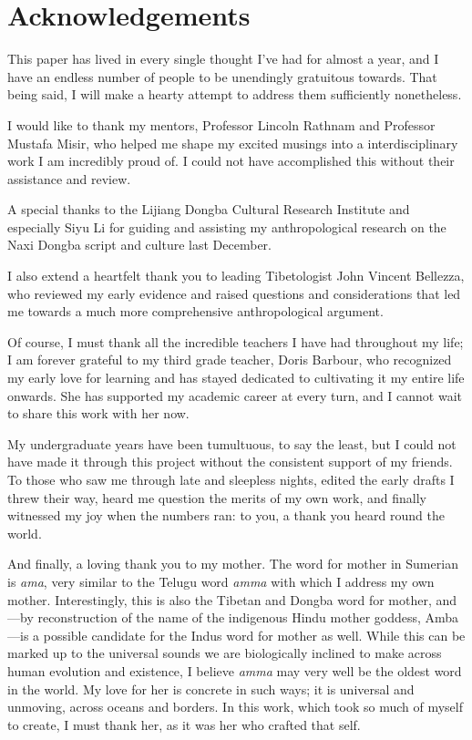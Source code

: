 \documentclass[11pt,a4paper,oneside]{report}
\begin{document}
\vspace{4\bigskipamount}




\chapter*{Acknowledgements}
\label{acknowledgements}

This paper has lived in every single thought I’ve had for almost a year, and I have an endless number of people to be unendingly gratuitous towards. That being said, I will make a hearty attempt to address them sufficiently nonetheless.

I would like to thank my mentors, Professor Lincoln Rathnam and Professor Mustafa Misir, who helped me shape my excited musings into a interdisciplinary work I am incredibly proud of. I could not have accomplished this without their assistance and review.

A special thanks to the Lijiang Dongba Cultural Research Institute and especially Siyu Li for guiding and assisting my anthropological research on the Naxi Dongba script and culture last December.

I also extend a heartfelt thank you to leading Tibetologist John Vincent Bellezza, who reviewed my early evidence and raised questions and considerations that led me towards a much more comprehensive anthropological argument.

Of course, I must thank all the incredible teachers I have had throughout my life; I am forever grateful to my third grade teacher, Doris Barbour, who recognized my early love for learning and has stayed dedicated to cultivating it my entire life onwards. She has supported my academic career at every turn, and I cannot wait to share this work with her now.

My undergraduate years have been tumultuous, to say the least, but I could not have made it through this project without the consistent support of my friends. To those who saw me through late and sleepless nights, edited the early drafts I threw their way, heard me question the merits of my own work, and finally witnessed my joy when the numbers ran: to you, a thank you heard round the world.

And finally, a loving thank you to my mother. The word for mother in Sumerian is \textit{ama}, very similar to the Telugu word \textit{amma} with which I address my own mother. Interestingly, this is also the Tibetan and Dongba word for mother, and—by reconstruction of the name of the indigenous Hindu mother goddess, Amba—is a possible candidate for the Indus word for mother as well. While this can be marked up to the universal sounds we are biologically inclined to make across human evolution and existence, I believe \textit{amma} may very well be the oldest word in the world. My love for her is concrete in such ways; it is universal and unmoving, across oceans and borders. In this work, which took so much of myself to create, I must thank her, as it was her who crafted that self.
\end{document}
